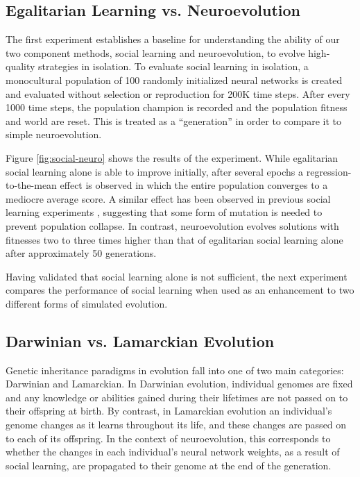 \documentclass{sig-alternate}
\begin{document}
\subsection*{Egalitarian Learning vs. Neuroevolution}

The first experiment establishes a baseline for understanding the ability of our two component methods, social learning and neuroevolution, to evolve high-quality strategies in isolation. To evaluate social learning in isolation, a monocultural population of 100 randomly initialized neural networks is created and evaluated without selection or reproduction for 200K time steps. After every 1000 time steps, the population champion is recorded and the population fitness and world are reset. This is treated as a ``generation'' in order to compare it to simple neuroevolution.

Figure \ref{fig:social-neuro} shows the results of the experiment. While egalitarian social learning alone is able to improve initially, after several epochs a regression-to-the-mean effect is observed in which the entire population converges to a mediocre average score. A similar effect has been observed in previous social learning experiments \cite{denaro1996cultural}, suggesting that some form of mutation is needed to prevent population collapse. In contrast, neuroevolution evolves solutions with fitnesses two to three times higher than that of egalitarian social learning alone after approximately 50 generations.

Having validated that social learning alone is not sufficient, the next experiment compares the performance of social learning when used as an enhancement to two different forms of simulated evolution.

\subsection*{Darwinian vs. Lamarckian Evolution}

Genetic inheritance paradigms in evolution fall into one of two main categories: Darwinian and Lamarckian. In Darwinian evolution, individual genomes are fixed and any knowledge or abilities gained during their lifetimes are not passed on to their offspring at birth. By contrast, in Lamarckian evolution an individual's genome changes as it learns throughout its life, and these changes are passed on to each of its offspring. In the context of neuroevolution, this corresponds to whether the changes in each individual's neural network weights, as a result of social learning, are propagated to their genome at the end of the generation.
\end{document}
